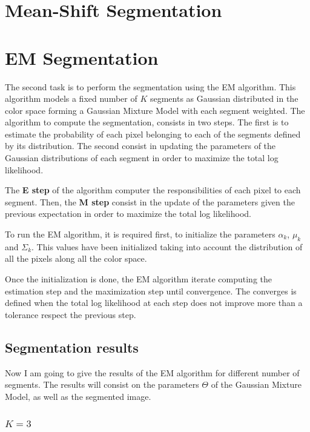 \documentclass{ethz_report}
\begin{document}
\section*{Mean-Shift Segmentation}




\section*{EM Segmentation}

The second task is to perform the segmentation using the EM algorithm.
This algorithm models a fixed number of $K$ segments as Gaussian distributed in the color space forming a Gaussian Mixture Model with each segment weighted.
The algorithm to compute the segmentation, consists in two steps.
The first is to estimate the probability of each pixel belonging to each of the segments defined by its distribution.
The second consist in updating the parameters of the Gaussian distributions of each segment in order to maximize the total log likelihood.

The \textbf{E step} of the algorithm computer the responsibilities of each pixel to each segment.
Then, the \textbf{M step} consist in the update of the parameters given the previous expectation in order to maximize the total log likelihood.

To run the EM algorithm, it is required first, to initialize the parameters $\alpha_k$, $\mu_k$ and $\Sigma_k$. This values have been initialized taking into account the distribution of all the pixels along all the color space.

Once the initialization is done, the EM algorithm iterate computing the estimation step and the maximization step until convergence.
The converges is defined when the total log likelihood at each step does not improve more than a tolerance respect the previous step.

\subsection*{Segmentation results}

Now I am going to give the results of the EM algorithm for different number of segments. The results will consist on the parameters $\Theta$ of the Gaussian Mixture Model, as well as the segmented image.

\subsubsection*{$K=3$}
\end{document}
